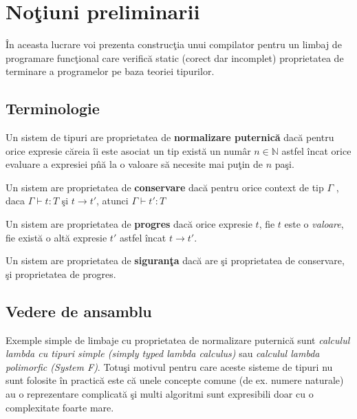 
\chapter{No\c tiuni preliminarii}
\label{Capitolul2}

\^ In aceasta lucrare voi prezenta construc\c tia unui compilator pentru un limbaj de programare func\c tional care verific\u a static (corect dar incomplet) proprietatea de terminare a programelor pe baza teoriei tipurilor.

\section{Terminologie}
\done{}
\begin{definition}
Un sistem de tipuri are proprietatea de \textbf{normalizare puternic\u a} dac\u a pentru orice expresie c\u areia \^ ii este asociat un tip exist\u a un num\^ ar $n\in\mathbb{N}$ astfel \^ incat orice evaluare a expresiei p\^ n\u a la o valoare s\u a necesite mai pu\c tin de $n$ pa\c si.
\end{definition}

\begin{definition}
Un sistem are proprietatea de \textbf{conservare} dac\u a pentru orice context de tip $\Gamma$ , daca $\Gamma \vdash t : T$ \c si $t \to t'$, atunci $\Gamma \vdash t' : T$
\end{definition}

\begin{definition}
Un sistem are proprietatea de \textbf{progres} dac\u a orice expresie $t$,  fie $t$ este o \emph{valoare}, fie exist\u a o alt\u a expresie $t'$ astfel \^ incat $t \to t'$.
\end{definition}

\begin{definition}
Un sistem are proprietatea de \textbf{siguran\c ta} dac\u a are \c si proprietatea de conservare, \c si proprietatea de progres.
\end{definition}

\section{Vedere de ansamblu}

Exemple simple de limbaje cu proprietatea de normalizare puternic\u a sunt \emph{calculul lambda cu tipuri simple (simply typed lambda calculus)} sau \emph{calculul lambda polimorfic (System F)}. Totu\c si motivul pentru care aceste sisteme de tipuri nu sunt folosite \^ in practic\u a este c\u a unele concepte comune (de ex. numere naturale) au o reprezentare complicat\u a \c si multi algoritmi sunt expresibili doar cu o complexitate foarte mare.

